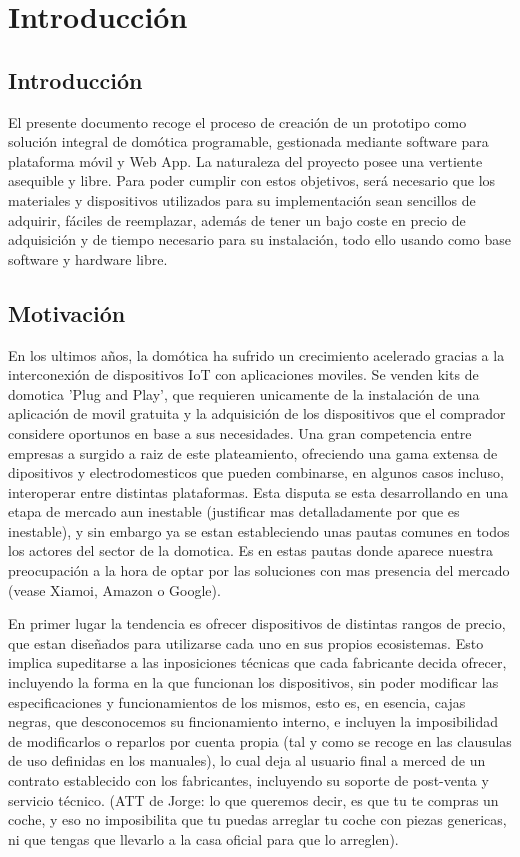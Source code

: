 \cleardoublepage

\chapter{Introducción}

\section{Introducción}
\label{ch:Capitulo1}
El presente documento recoge el proceso de creación de un prototipo como solución integral de domótica programable, gestionada mediante software para plataforma móvil y Web App. La naturaleza del proyecto posee una vertiente asequible y libre. Para poder cumplir con estos objetivos, será necesario que los materiales y dispositivos utilizados para su implementación sean sencillos de adquirir, fáciles de reemplazar, además de tener un bajo coste en precio de adquisición y de tiempo necesario para su instalación, todo ello usando como base software y hardware libre.

\section{Motivación}
\label{ch:Capitulo1.1}

En los ultimos años, la domótica ha sufrido un crecimiento acelerado gracias a la interconexión de dispositivos IoT con aplicaciones moviles. Se venden kits de domotica 'Plug and Play', que requieren unicamente de la instalación de una aplicación de movil gratuita y la adquisición de los dispositivos que el comprador considere oportunos en base a sus necesidades. Una gran competencia entre empresas a surgido a raiz de este plateamiento, ofreciendo una gama extensa de dipositivos y electrodomesticos que pueden combinarse, en algunos casos incluso, interoperar entre distintas plataformas. Esta disputa se esta desarrollando en una etapa de mercado aun inestable (justificar mas detalladamente por que es inestable), y sin embargo ya se estan estableciendo unas pautas comunes en todos los actores del sector de la domotica. Es en estas pautas donde aparece nuestra preocupación a la hora de optar por las soluciones con mas presencia del mercado (vease Xiamoi, Amazon o Google).

En primer lugar la tendencia es ofrecer dispositivos de distintas rangos de precio, que estan diseñados para utilizarse cada uno en sus propios ecosistemas. Esto implica supeditarse a las inposiciones técnicas que cada fabricante decida ofrecer, incluyendo la forma en la que funcionan los dispositivos, sin poder modificar las especificaciones y funcionamientos de los mismos, esto es, en esencia, cajas negras, que desconocemos su fincionamiento interno, e incluyen la imposibilidad de modificarlos o reparlos por cuenta propia (tal y como se recoge en las clausulas de uso definidas en los manuales), lo cual deja al usuario final a merced de un contrato establecido con los fabricantes, incluyendo su soporte de post-venta y servicio técnico. (ATT de Jorge: lo que queremos decir, es que tu te compras un coche, y eso no imposibilita que tu puedas arreglar tu coche con piezas genericas, ni que tengas que llevarlo a la casa oficial para que lo arreglen).


